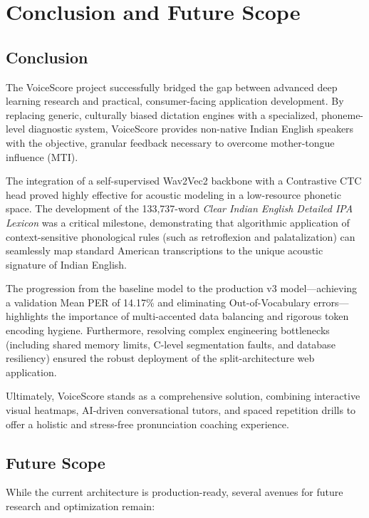 \chapter{Conclusion and Future Scope}

\section{Conclusion}
The VoiceScore project successfully bridged the gap between advanced deep learning research and practical, consumer-facing application development. By replacing generic, culturally biased dictation engines with a specialized, phoneme-level diagnostic system, VoiceScore provides non-native Indian English speakers with the objective, granular feedback necessary to overcome mother-tongue influence (MTI).

The integration of a self-supervised Wav2Vec2 backbone with a Contrastive CTC head proved highly effective for acoustic modeling in a low-resource phonetic space. The development of the 133,737-word \textit{Clear Indian English Detailed IPA Lexicon} was a critical milestone, demonstrating that algorithmic application of context-sensitive phonological rules (such as retroflexion and palatalization) can seamlessly map standard American transcriptions to the unique acoustic signature of Indian English.

The progression from the baseline model to the production v3 model—achieving a validation Mean PER of 14.17\% and eliminating Out-of-Vocabulary errors—highlights the importance of multi-accented data balancing and rigorous token encoding hygiene. Furthermore, resolving complex engineering bottlenecks (including shared memory limits, C-level segmentation faults, and database resiliency) ensured the robust deployment of the split-architecture web application.

Ultimately, VoiceScore stands as a comprehensive solution, combining interactive visual heatmaps, AI-driven conversational tutors, and spaced repetition drills to offer a holistic and stress-free pronunciation coaching experience.

\section{Future Scope}
While the current architecture is production-ready, several avenues for future research and optimization remain:

